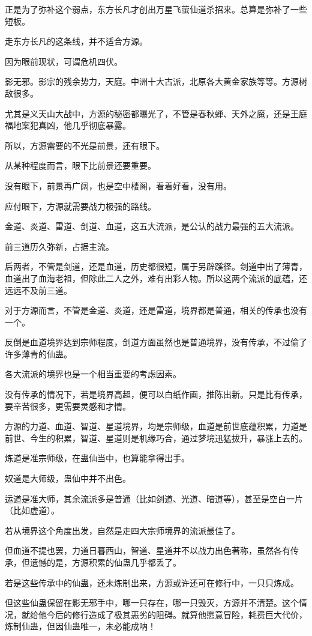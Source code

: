 \begin{this_body}
正是为了弥补这个弱点，东方长凡才创出万星飞萤仙道杀招来。总算是弥补了一些短板。

走东方长凡的这条线，并不适合方源。

因为眼前现状，可谓危机四伏。

影无邪。影宗的残余势力，天庭。中洲十大古派，北原各大黄金家族等等。方源树敌很多。

尤其是义天山大战中，方源的秘密都曝光了，不管是春秋蝉、天外之魔，还是王庭福地案犯真凶，他几乎彻底暴露。

所以，方源需要的不光是前景，还有眼下。

从某种程度而言，眼下比前景还要重要。

没有眼下，前景再广阔，也是空中楼阁，看着好看，没有用。

应付眼下，方源就需要战力极强的路线。

金道、炎道、雷道、剑道、血道，这五大流派，是公认的战力最强的五大流派。

前三道历久弥新，占据主流。

后两者，不管是剑道，还是血道，历史都很短，属于另辟蹊径。剑道中出了薄青，血道出了血海老祖，但除此二人之外，难有出彩人物。所以这两个流派的底蕴，还远远不及前三道。

对于方源而言，不管是金道、炎道，还是雷道，境界都是普通，相关的传承也没有一个。

反倒是血道境界达到宗师程度，剑道方面虽然也是普通境界，没有传承，不过偷了许多薄青的仙蛊。

各大流派的境界也是一个相当重要的考虑因素。

没有传承的情况下，若是境界高超，便可以白纸作画，推陈出新。只是比有传承，要辛苦很多，更需要灵感和才情。

方源的力道、血道、智道、星道境界，均是宗师级，血道是前世底蕴积累，力道是前世、今生的积累，智道、星道则是机缘巧合，通过梦境迅猛拔升，暴涨上去的。

炼道是准宗师级，在蛊仙当中，也算能拿得出手。

奴道是大师级，蛊仙中并不出色。

运道是准大师，其余流派多是普通（比如剑道、光道、暗道等），甚至是空白一片（比如虚道）。

若从境界这个角度出发，自然是走四大宗师境界的流派最佳了。

但血道不提也罢，力道日暮西山，智道、星道并不以战力出色著称，虽然各有传承，但遗憾的是，方源积累的仙蛊几乎都丢了。

若是这些传承中的仙蛊，还未炼制出来，方源或许还可在修行中，一只只炼成。

但这些仙蛊保留在影无邪手中，哪一只存在，哪一只毁灭，方源并不清楚。这个情况，就给他今后的修行造成了极其恶劣的阻碍。就算他愿意冒险，耗费巨大代价，炼制仙蛊，但因仙蛊唯一，未必能成呐！


\end{this_body}
